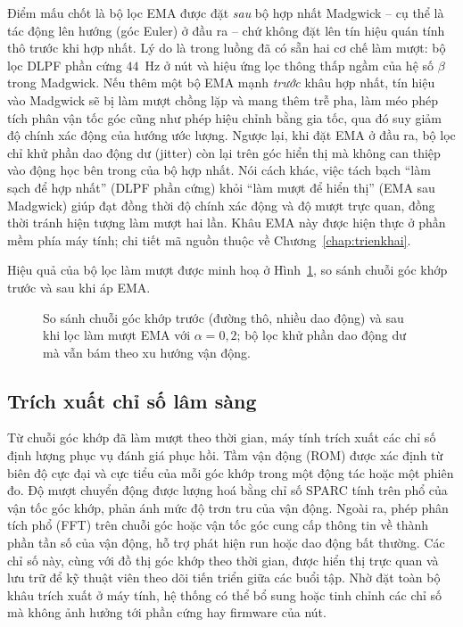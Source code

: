 \documentclass[../DoAn.tex]{subfiles}
\begin{document}
Điểm mấu chốt là bộ lọc EMA được đặt \textit{sau} bộ hợp nhất Madgwick -- cụ thể
là tác động lên hướng (góc Euler) ở đầu ra -- chứ không đặt lên tín hiệu quán tính
thô trước khi hợp nhất. Lý do là trong luồng đã có sẵn hai cơ chế làm mượt: bộ lọc
DLPF phần cứng $44$~Hz ở nút và hiệu ứng lọc thông thấp ngầm của hệ số $\beta$
trong Madgwick. Nếu thêm một bộ EMA mạnh \textit{trước} khâu hợp nhất, tín hiệu
vào Madgwick sẽ bị làm mượt chồng lặp và mang thêm trễ pha, làm méo phép tích phân
vận tốc góc cũng như phép hiệu chỉnh bằng gia tốc, qua đó suy giảm độ chính xác
động của hướng ước lượng. Ngược lại, khi đặt EMA ở đầu ra, bộ lọc chỉ khử phần dao
động dư (jitter) còn lại trên góc hiển thị mà không can thiệp vào động học bên
trong của bộ hợp nhất. Nói cách khác, việc tách bạch ``làm sạch để hợp nhất''
(DLPF phần cứng) khỏi ``làm mượt để hiển thị'' (EMA sau Madgwick) giúp đạt đồng
thời độ chính xác động và độ mượt trực quan, đồng thời tránh hiện tượng làm mượt
hai lần. Khâu EMA này được hiện thực ở phần mềm phía máy tính; chi tiết mã nguồn
thuộc về Chương~\ref{chap:trienkhai}.

Hiệu quả của bộ lọc làm mượt được minh hoạ ở Hình~\ref{fig:ema_effect}, so sánh chuỗi góc khớp trước và sau khi áp EMA.

\begin{figure}[h]
    \centering
    \caption{So sánh chuỗi góc khớp trước (đường thô, nhiều dao động) và sau khi lọc làm mượt EMA với $\alpha = 0{,}2$; bộ lọc khử phần dao động dư mà vẫn bám theo xu hướng vận động.}
    \label{fig:ema_effect}
\end{figure}

\subsection{Trích xuất chỉ số lâm sàng}
\label{subsec:xl_chiso}
Từ chuỗi góc khớp đã làm mượt theo thời gian, máy tính trích xuất các chỉ số định
lượng phục vụ đánh giá phục hồi. Tầm vận động (ROM) được xác định từ biên độ cực
đại và cực tiểu của mỗi góc khớp trong một động tác hoặc một phiên đo. Độ mượt
chuyển động được lượng hoá bằng chỉ số SPARC tính trên phổ của vận tốc góc khớp,
phản ánh mức độ trơn tru của vận động. Ngoài ra, phép phân tích phổ (FFT) trên
chuỗi góc hoặc vận tốc góc cung cấp thông tin về thành phần tần số của vận động,
hỗ trợ phát hiện run hoặc dao động bất thường. Các chỉ số này, cùng với đồ thị góc
khớp theo thời gian, được hiển thị trực quan và lưu trữ để kỹ thuật viên theo dõi
tiến triển giữa các buổi tập. Nhờ đặt toàn bộ khâu trích xuất ở máy tính, hệ thống
có thể bổ sung hoặc tinh chỉnh các chỉ số mà không ảnh hưởng tới phần cứng hay
firmware của nút.
\end{document}
